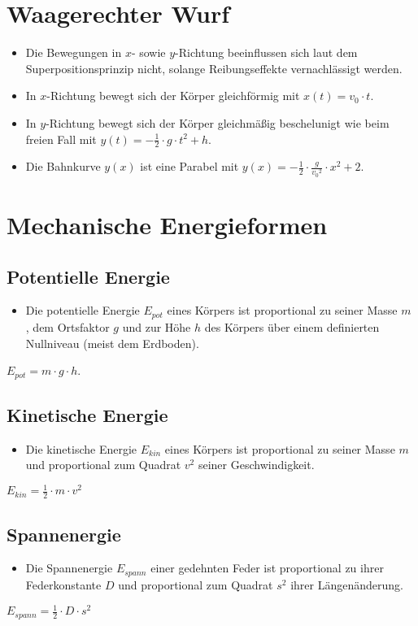 \documentclass{article}
\begin{document}
\section*{Waagerechter Wurf}
\begin{itemize}
	\item Die Bewegungen in $x$- sowie $y$-Richtung beeinflussen sich laut dem Superpositionsprinzip nicht, solange Reibungseffekte vernachlässigt werden.
	\item In $x$-Richtung bewegt sich der Körper gleichförmig mit $x(t) = v_0 \cdot t$.
	\item In $y$-Richtung bewegt sich der Körper gleichmäßig beschelunigt wie beim freien Fall mit $y(t) = -\frac{1}{2} \cdot g \cdot t^2 + h$.
	\item Die Bahnkurve $y(x)$ ist eine Parabel mit $y(x) = -\frac{1}{2} \cdot \frac{g}{{v_{0}}^2} \cdot x^2 + 2$.
\end{itemize}
\section*{Mechanische Energieformen}
\subsection*{Potentielle Energie}
\begin{itemize}
	\item Die potentielle Energie $E_{pot}$ eines Körpers ist proportional zu seiner Masse $m$ , dem Ortsfaktor $g$ und zur Höhe $h$ des Körpers über einem definierten Nullniveau (meist dem Erdboden).
\end{itemize}
\begin{center}
	$E_{pot} = m \cdot g \cdot h$.
\end{center}
\subsection*{Kinetische Energie}
\begin{itemize}
	\item Die kinetische Energie $E_{kin}$ eines Körpers ist proportional zu seiner Masse $m$ und proportional zum Quadrat $v^2$ seiner Geschwindigkeit.
\end{itemize}
\begin{center}
	$E_{kin} = \frac{1}{2} \cdot m \cdot v^2$
\end{center}
\subsection*{Spannenergie}
\begin{itemize}
	\item Die Spannenergie $E_{spann}$ einer gedehnten Feder ist proportional zu ihrer Federkonstante $D$ und proportional zum Quadrat $s^2$ ihrer Längenänderung.
\end{itemize}
\begin{center}
	$E_{spann} = \frac{1}{2} \cdot D \cdot s^2$
\end{center}
\end{document}
